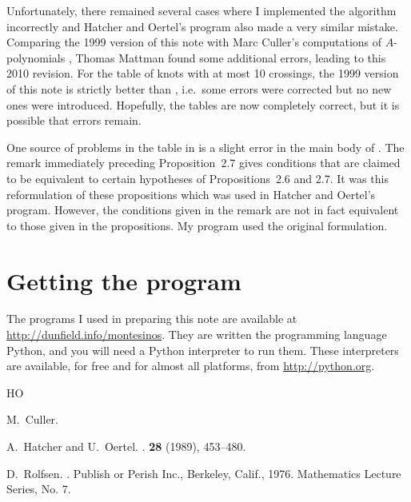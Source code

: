 \documentclass{elsart}
\begin{document}
Unfortunately, there remained several cases where I implemented the
algorithm incorrectly and Hatcher and Oertel's program also made a
very similar mistake.  Comparing the 1999 version of this note with
Marc Culler's computations of $A$-polynomials \cite{Culler}, Thomas
Mattman found some additional errors, leading to this 2010 revision.
For the table of knots with at most 10 crossings, the 1999 version of
this note is strictly better than \cite{HatcherOertel}, i.e.~some
errors were corrected but no new ones were introduced.  Hopefully, the
tables are now completely correct, but it is possible that errors
remain.

One source of problems in the table in \cite{HatcherOertel} is a
slight error in the main body of \cite{HatcherOertel}.  The remark
immediately preceding Proposition~2.7 gives conditions that are
claimed to be equivalent to certain hypotheses of Propositions~2.6 and
2.7.  It was this reformulation of these propositions which was used
in Hatcher and Oertel's program.  However, the conditions given in the
remark are not in fact equivalent to those given in the propositions.  My
program used the original formulation.

\section{Getting the program}\label{gettingprogram}

The programs I used in preparing this note are available at
\url{http://dunfield.info/montesinos}.  They are written the
programming language Python, and you will need a Python interpreter to
run them.  These interpreters are available, for free and for almost
all platforms, from \url{http://python.org}.

\iftopology
\else
\vspace{-0.1in}
\fi
\begin{thebibliography}{HO}

M.~Culler.
 \\ 

A.~Hatcher and U.~Oertel.
.
 {\bf 28} (1989), 453--480.

D.~Rolfsen.
.
\newblock Publish or Perish Inc., Berkeley, Calif., 1976.
\newblock Mathematics Lecture Series, No. 7.

\end{thebibliography}
\end{document}
